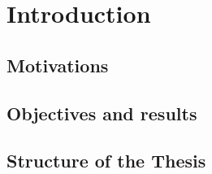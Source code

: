 \chapter{Introduction}

\begin{citazione}

\end{citazione}
\newpage

\section{Motivations} 

\section{Objectives and results} 

\section{Structure of the Thesis}
